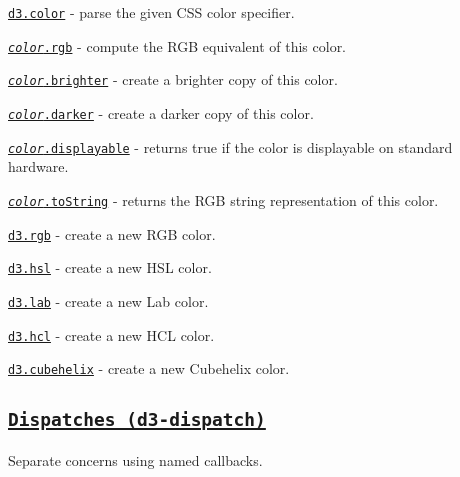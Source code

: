 \begin{DoxyItemize}
\item \href{https://github.com/d3/d3-color/blob/master/README.md#color}{\tt d3.\+color} -\/ parse the given C\+SS color specifier.
\item \href{https://github.com/d3/d3-color/blob/master/README.md#color_rgb}{\tt {\itshape color}.rgb} -\/ compute the R\+GB equivalent of this color.
\item \href{https://github.com/d3/d3-color/blob/master/README.md#color_brighter}{\tt {\itshape color}.brighter} -\/ create a brighter copy of this color.
\item \href{https://github.com/d3/d3-color/blob/master/README.md#color_darker}{\tt {\itshape color}.darker} -\/ create a darker copy of this color.
\item \href{https://github.com/d3/d3-color/blob/master/README.md#color_displayable}{\tt {\itshape color}.displayable} -\/ returns true if the color is displayable on standard hardware.
\item \href{https://github.com/d3/d3-color/blob/master/README.md#color_toString}{\tt {\itshape color}.to\+String} -\/ returns the R\+GB string representation of this color.
\item \href{https://github.com/d3/d3-color/blob/master/README.md#rgb}{\tt d3.\+rgb} -\/ create a new R\+GB color.
\item \href{https://github.com/d3/d3-color/blob/master/README.md#hsl}{\tt d3.\+hsl} -\/ create a new H\+SL color.
\item \href{https://github.com/d3/d3-color/blob/master/README.md#lab}{\tt d3.\+lab} -\/ create a new Lab color.
\item \href{https://github.com/d3/d3-color/blob/master/README.md#hcl}{\tt d3.\+hcl} -\/ create a new H\+CL color.
\item \href{https://github.com/d3/d3-color/blob/master/README.md#cubehelix}{\tt d3.\+cubehelix} -\/ create a new Cubehelix color.
\end{DoxyItemize}

\subsection*{\href{https://github.com/d3/d3-dispatch}{\tt Dispatches (d3-\/dispatch)}}

Separate concerns using named callbacks.


